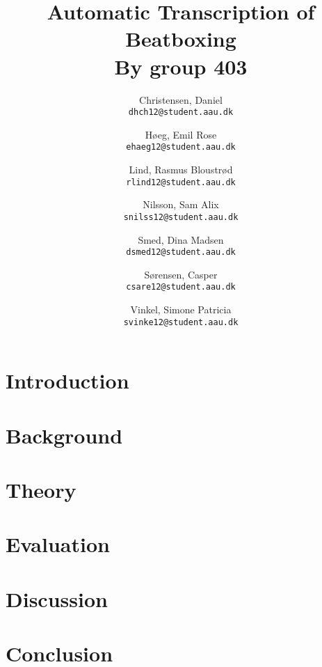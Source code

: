 \documentclass[12pt,a4paper]{report}
\author{
	Christensen, Daniel\\
	\texttt{dhch12@student.aau.dk}
	\and
	Høeg, Emil Rose \\
	\texttt{ehaeg12@student.aau.dk}
	\and
	Lind, Rasmus Bloustrød\\
	\texttt{rlind12@student.aau.dk}
	\and
	Nilsson, Sam Alix \\
	\texttt{snilss12@student.aau.dk}
	\and
	Smed, Dina Madsen\\
	\texttt{dsmed12@student.aau.dk}
	\and
	Sørensen, Casper\\
	\texttt{csare12@student.aau.dk}
	\and
	Vinkel, Simone Patricia \\
	\texttt{svinke12@student.aau.dk}
}
\title{{\LARGE \textbf{Automatic Transcription of Beatboxing}} \\
{{\Large By group 403}}}
\begin{document}
\maketitle
\tableofcontents
\chapter{Introduction}

\chapter{Background}


%

\chapter{Theory}






\chapter{Evaluation}
\chapter{Discussion}
\chapter{Conclusion}


\end{document}
